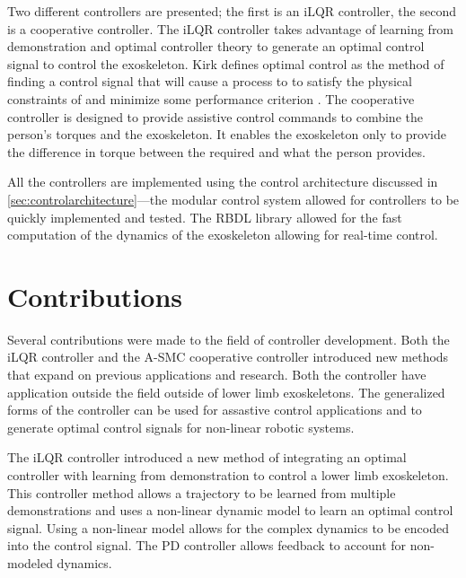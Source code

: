 Two different controllers are presented; the first is an iLQR controller, the second is a cooperative controller. The iLQR controller takes advantage of learning from demonstration and optimal controller theory to generate an optimal control signal to control the exoskeleton. Kirk defines optimal control as the method of finding a control signal that will cause a process to to satisfy the physical constraints of and minimize some performance criterion \cite{kirk2004optimal}.  The cooperative controller is designed to provide assistive control commands to combine the person's torques and the exoskeleton. It enables the exoskeleton only to provide the difference in torque between the required and what the person provides. 

All the controllers are implemented using the control architecture discussed in \autoref{sec:controlarchitecture}—the modular control system allowed for controllers to be quickly implemented and tested. The RBDL library allowed for the fast computation of the dynamics of the exoskeleton allowing for real-time control. 







\section{Contributions}

Several contributions were made to the field of controller development. Both the iLQR controller and the A-SMC cooperative controller introduced new methods that expand on previous applications and research. Both the controller have application outside the field outside of lower limb exoskeletons. The generalized forms of the controller can be used for assastive control applications and to generate optimal control signals for non-linear robotic systems. 


The iLQR controller introduced a new method of integrating an optimal controller with learning from demonstration to control a lower limb exoskeleton. This controller method allows a trajectory to be learned from multiple demonstrations and uses a non-linear dynamic model to learn an optimal control signal.  Using a non-linear model allows for the complex dynamics to be encoded into the control signal. The PD controller allows feedback to account for non-modeled dynamics. 

